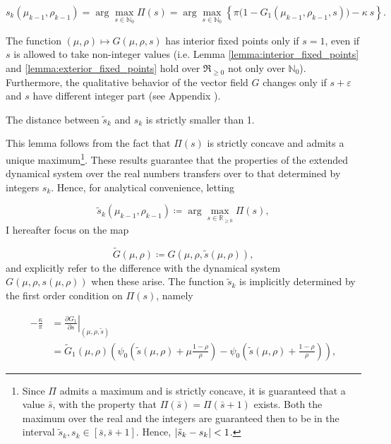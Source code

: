 \documentclass[../../main.tex]{subfiles}
\begin{document}
\begin{equation} \label{eq:firm_problem}
  s_k(\mu_{k - 1}, \rho_{k - 1}) = \arg\max_{s \in \mathbb{N}_0} \Pi(s) = \arg\max_{s \in \mathbb{N}_0} \left\{ \pi \Big(1 - G_1(\mu_{k - 1}, \rho_{k - 1}, s)\Big) - \kappa \  s \right\}.
\end{equation}



The function $(\mu, \rho) \mapsto G(\mu, \rho, s)$ has interior fixed points only if $s = 1$, even if $s$ is allowed to take non-integer values (i.e. Lemma \ref{lemma:interior_fixed_points} and \ref{lemma:exterior_fixed_points} hold over $\Re_{\geq 0}$ not only over $\mathbb{N}_0$). Furthermore, the qualitative behavior of the vector field $G$ changes only if $s + \varepsilon$ and $s$ have different integer part (see Appendix ). 

\begin{lemma}
  The distance between $\tilde{s}_k$ and $s_k$ is strictly smaller than 1.
\end{lemma}

This lemma follows from the fact that $\Pi(s)$ is strictly concave and admits a unique maximum\footnote{Since $\Pi$ admits a maximum and is strictly concave, it is guaranteed that a value $\bar{s}$, with the property that $\Pi(\bar{s}) = \Pi(\bar{s} + 1)$ exists. Both the maximum over the real and the integers are guaranteed then to be in the interval $\tilde{s}_k, s_k \in [\bar{s}, \bar{s} + 1]$. Hence, $\left\lvert\tilde{s}_k - s_k\right\rvert < 1$.}. These results guarantee that the properties of the extended dynamical system over the real numbers transfers over to that determined by integers $s_k$. Hence, for analytical convenience, letting

\begin{equation}
  \tilde{s}_k(\mu_{k - 1}, \rho_{k - 1}) \coloneqq \arg\max_{s \in \mathbb{R}_{\geq 0}} \Pi(s),
\end{equation} I hereafter focus on the map

\begin{equation}
  \tilde{G}(\mu, \rho) \coloneqq G(\mu, \rho, \tilde{s}(\mu, \rho)),
\end{equation} and explicitly refer to the difference with the dynamical system $G(\mu, \rho, s(\mu, \rho))$ when these arise. The function $\tilde{s}_k$ is implicitly determined by the first order condition on $\Pi(s)$, namely

\begin{equation} \label{eq:exact-foc}
  \begin{split}
    -\frac{\kappa}{\pi} &= \left. \frac{\partial G_1}{\partial s} \right\vert_{(\mu, \rho, \tilde{s})}  \\
    &= \tilde{G}_1(\mu, \rho) \left(\psi_0\left(\tilde{s}(\mu, \rho) + \mu \frac{1 - \rho}{\rho} \right) - \psi_0\left(\tilde{s}(\mu, \rho) + \frac{1 - \rho}{\rho} \right)  \right),
  \end{split}
\end{equation}
\end{document}
